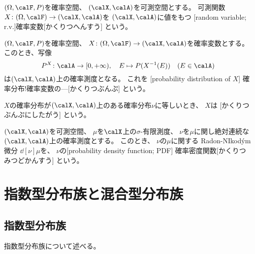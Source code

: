 \documentclass[report]{jlreq}
\begin{document}
\begin{definition}[確率変数]
    $(\Omega, \calF, P)$を確率空間、
    $(\calX, \calA)$を可測空間とする。
    可測関数$X \colon (\Omega, \calF) \to (\calX, \calA)$を
    $(\calX, \calA)$に値をもつ
    [random variable; r.v.]{確率変数}[かくりつへんすう]
    という。
\end{definition}

\begin{definition}[確率変数の確率分布]
    $(\Omega, \calF, P)$を確率空間、
    $X \colon (\Omega, \calF) \to (\calX, \calA)$を確率変数とする。
    このとき、写像
    \begin{equation}
        P^X \colon \calA \to [0, +\infty),
            \quad
            E \mapsto P(X^{-1}(E))
            \quad
            (E \in \calA)
    \end{equation}
    は$(\calX, \calA)$上の確率測度となる。
    これを
    [probability distribution of $X$]
        {確率分布!確率変数の---}[かくりつぶんぷ]
    という。

    $X$の確率分布が$(\calX, \calA)$上のある確率分布$\nu$に等しいとき、
    $X$は
    [かくりつぶんぷにしたがう]
    という。
\end{definition}

\begin{definition}[確率密度関数]
    $(\calX, \calA)$を可測空間、
    $\mu$を$\calX$上の$\sigma$-有限測度、
    $\nu$を$\mu$に関し絶対連続な$(\calX, \calA)$上の確率測度とする。
    このとき、
    $\nu$の$\mu$に関する Radon-NIkod\'ym 微分
    $\dd[\nu]{\mu}$を、
    $\nu$の[probability density function; PDF]
        {確率密度関数}[かくりつみつどかんすう]
    という。
\end{definition}



%
\section{指数型分布族と混合型分布族}

\subsection{指数型分布族}

指数型分布族について述べる。
\end{document}

